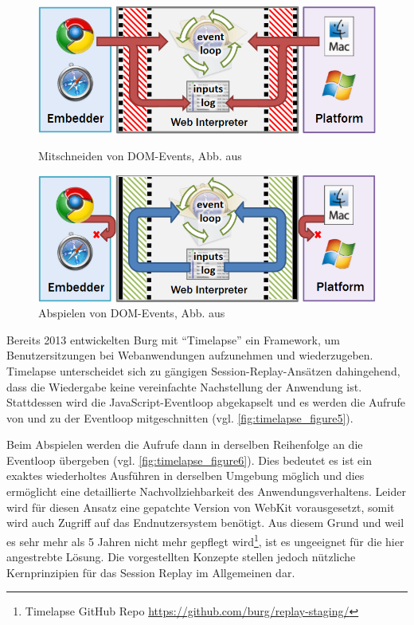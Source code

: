 \begin{figure}
\centering
\includegraphics[width=\linewidth]{img/03_methoden/timelapse_figure5.png}
\caption{Mitschneiden von DOM-Events, Abb. aus \cite{TimelapsePaper}}
\label{fig:timelapse_figure5}
\smallskip\par
\includegraphics[width=\linewidth]{img/03_methoden/timelapse_figure6.png}
\caption{Abspielen von DOM-Events, Abb. aus \cite{TimelapsePaper}}
\label{fig:timelapse_figure6}
\end{figure}

Bereits 2013 entwickelten Burg \etal \cite{TimelapsePaper} mit \enquote{Timelapse} ein Framework, um Benutzersitzungen bei Webanwendungen aufzunehmen und wiederzugeben. Timelapse unterscheidet sich zu gängigen Session-Replay-Ansätzen dahingehend, dass die Wiedergabe keine vereinfachte Nachstellung der Anwendung ist. Stattdessen wird die JavaScript-Eventloop abgekapselt und es werden die Aufrufe von und zu der Eventloop mitgeschnitten (vgl. \autoref{fig:timelapse_figure5}).

Beim Abspielen werden die Aufrufe dann in derselben Reihenfolge an die Eventloop übergeben (vgl. \autoref{fig:timelapse_figure6}). Dies bedeutet es ist ein exaktes wiederholtes Ausführen in derselben Umgebung möglich und dies ermöglicht eine detaillierte Nachvollziehbarkeit des Anwendungsverhaltens. Leider wird für diesen Ansatz eine gepatchte Version von WebKit vorausgesetzt, somit wird auch Zugriff auf das Endnutzersystem benötigt. Aus diesem Grund und weil es sehr mehr als 5 Jahren nicht mehr gepflegt wird\footnote{Timelapse GitHub Repo \url{https://github.com/burg/replay-staging/}}, ist es ungeeignet für die hier angestrebte Lösung. Die vorgestellten Konzepte stellen jedoch nützliche Kernprinzipien für das Session Replay im Allgemeinen dar.